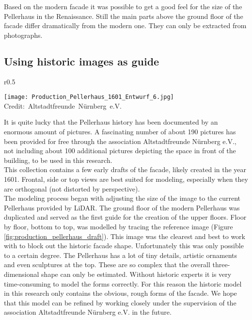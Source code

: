 Based on the modern facade it was possible to get a good feel for the size of the Pellerhaus in the Renaissance. Still the main parts above the ground floor of the facade differ dramatically from the modern one. They can only be extracted from photographs.


\subsection{Using historic images as guide}

\begin{wrapfigure}{r}{0.5\textwidth}
	
	\centering
	
	\texttt{[image: Production\_Pellerhaus\_1601\_Entwurf\_6.jpg]}
	\hbox{\scriptsize Credit: Altstadtfreunde Nürnberg e.V.}
	\caption{Early draft of the Pellerhaus facade of around 1601}
	\label{fig:production_pellerhaus_draft}
	\vspace{-10pt}
	
\end{wrapfigure}

It is quite lucky that the Pellerhaus history has been documented by an enormous amount of pictures. A fascinating number of about 190 pictures has been provided for free through the association Altstadtfreunde Nürnberg e.V., not including about 100 additional pictures depicting the space in front of the building, to be used in this research.\\

This collection contains a few early drafts of the facade, likely created in the year 1601. Frontal, side or top views are best suited for modeling, especially when they are orthogonal (not distorted by perspective).\\

The modeling process began with adjusting the size of the image to the current Pellerhaus provided by LiDAR. The ground floor of the modern Pellerhaus was duplicated and served as the first guide for the creation of the upper floors. Floor by floor, bottom to top, was modelled by tracing the reference image (Figure \ref{fig:production_pellerhaus_draft}). This image was the clearest and best to work with to block out the historic facade shape. Unfortunately this was only possible to a certain degree. The Pellerhaus has a lot of tiny details, artistic ornaments and even sculptures at the top. These are so complex that the overall three-dimensional shape can only be estimated. Without historic experts it is very time-consuming to model the forms correctly. For this reason the historic model in this research only contains the obvious, rough forms of the facade. We hope that this model can be refined by working closely under the supervision of the association Altstadtfreunde Nürnberg e.V. in the future.

